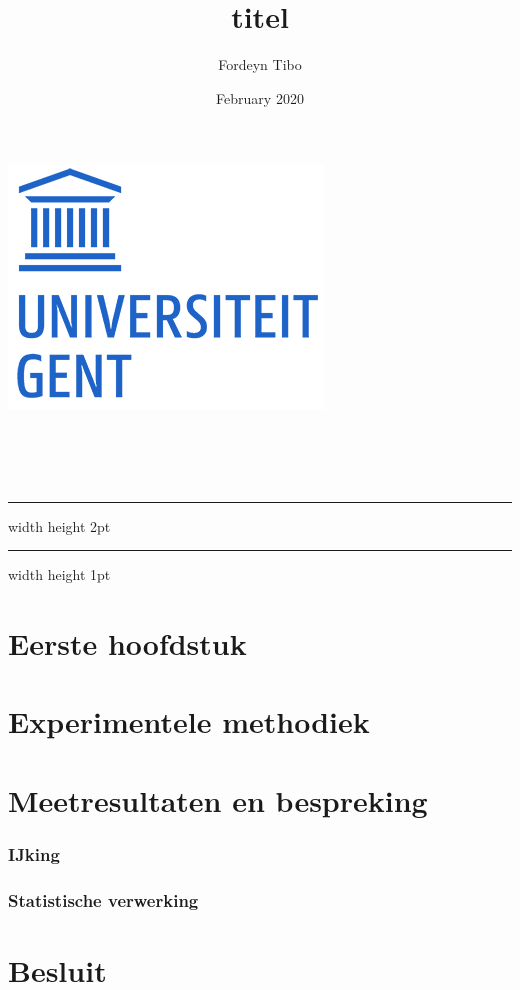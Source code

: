 \documentclass{article}
\title{titel}
\author{Fordeyn Tibo}
\date{February 2020}
\makeatletter
\renewcommand{\maketitle}{
    \begin{center}
    \begin{minipage}{0.15\linewidth}%
    \includegraphics[width=0.90\linewidth]{figures/ugent-logo.png}
    \end{minipage}\hspace{10pt}
    \begin{minipage}{0.8\linewidth}%
    \begin{center}
            \vspace{.35cm}
            {\bf {\Huge \@title}}\\
            \vspace{.2cm}
            \textbf{ \Large \@author}  \\
            \vspace{.15cm}
            \@date \\
            \vspace{.1cm}
    \end{center}
    \end{minipage}%
    \end{center}
    \begin{center}
    \end{center}
\hrule width \hsize height 2pt \kern 1mm  \hrule width \hsize height 1pt
}
\makeatother
\begin{document}
\maketitle

\section{Eerste hoofdstuk}


\section{Experimentele methodiek}

\section{Meetresultaten en bespreking}


\subsubsection*{IJking}{\indent}

\subsubsection*{Statistische verwerking}{\indent}

\section{Besluit}
\end{document}
